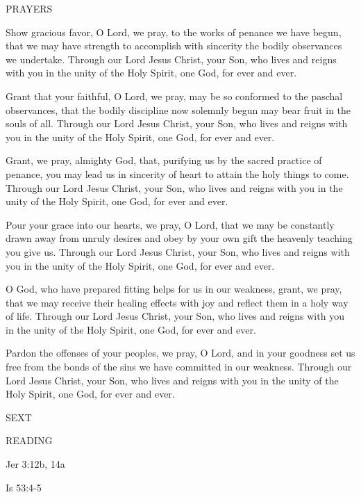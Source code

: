 \noindent\small PRAYERS
\begin{description}[labelindent=\parindent, leftmargin=*]
\item [Friday after Ash Wednesday:] 	Show gracious favor, O Lord, we pray, to the works of penance we have begun, that we may have strength to accomplish with sincerity the bodily observances we undertake. Through our Lord Jesus Christ, your Son, who lives and reigns with you in the unity of the Holy Spirit, one God, for ever and ever.
\item [Week 1:] 	Grant that your faithful, O Lord, we pray, may be so conformed to the paschal observances, that the bodily discipline now solemnly begun may bear fruit in the souls of all. Through our Lord Jesus Christ, your Son, who lives and reigns with you in the unity of the Holy Spirit, one God, for ever and ever.
\item [Week 2:] 	Grant, we pray, almighty God, that, purifying us by the sacred practice of penance, you may lead us in sincerity of heart to attain the holy things to come. Through our Lord Jesus Christ, your Son, who lives and reigns with you in the unity of the Holy Spirit, one God, for ever and ever.
\item [Week 3:] 	Pour your grace into our hearts, we pray, O Lord, that we may be constantly drawn away from unruly desires and obey by your own gift the heavenly teaching you give us. Through our Lord Jesus Christ, your Son, who lives and reigns with you in the unity of the Holy Spirit, one God, for ever and ever.
\item [Week 4:] 	O God, who have prepared fitting helps for us in our weakness, grant, we pray, that we may receive their healing effects with joy and reflect them in a holy way of life. Through our Lord Jesus Christ, your Son, who lives and reigns with you in the unity of the Holy Spirit, one God, for ever and ever.
\item [Week 5:] 	Pardon the offenses of your peoples, we pray, O Lord, and in your goodness set us free from the bonds of the sins we have committed in our weakness. Through our Lord Jesus Christ, your Son, who lives and reigns with you in the unity of the Holy Spirit, one God, for ever and ever.
\end{description}

\begin{flushleft}\normalsize{\uppercase{SEXT\\}}\end{flushleft}
\noindent\small READING
\begin{description}[labelindent=\parindent, leftmargin=*]
\item [Friday after Ash Wednesday \& Weeks 1-4:]     Jer 3:12b, 14a \textbf{    \\}
\item [Week 5:]    Is 53:4-5   \textbf{} 
\end{description}

